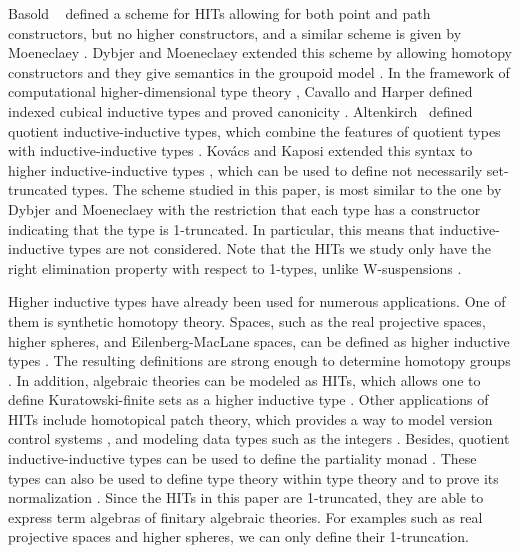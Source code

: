 Basold \etal \ \cite{BasoldGW17} defined a scheme for HITs allowing for both point and path constructors,
but no higher constructors, and a similar scheme is given by
Moeneclaey \cite{moeneclaey2016schema}. 
Dybjer and Moeneclaey extended this scheme by allowing homotopy constructors and
they give semantics in the groupoid model \cite{DBLP:journals/entcs/DybjerM18}.
In the framework of computational higher-dimensional type theory \cite{AngiuliHW17},
Cavallo and Harper defined indexed cubical inductive types and proved canonicity \cite{CavalloH19}.
Altenkirch \etal \ defined quotient inductive-inductive types, which combine the features
of quotient types with inductive-inductive types \cite{forsberg2010inductive,AltenkirchCDKF18}.
Kov\'acs and Kaposi extended this syntax to higher inductive-inductive types \cite{KaposiK18},
which can be used to define not necessarily set-truncated types.
The scheme studied in this paper, is most similar to the one by Dybjer and Moeneclaey \cite{DBLP:journals/entcs/DybjerM18}
with the restriction that each type has a constructor indicating that the type is 1-truncated.
In particular, this means that inductive-inductive types are not considered.
Note that the HITs we study only have the right elimination property with respect to 1-types,
unlike W-suspensions \cite{Sojakova15,sojakovaPhD}.

Higher inductive types have already been used for numerous applications.
One of them is synthetic homotopy theory.
Spaces, such as the real projective spaces, higher spheres, and Eilenberg-MacLane spaces,
can be defined as higher inductive types \cite{licata2013pi,LicataF14,DBLP:conf/lics/BuchholtzR17,hottbook}.
The resulting definitions are strong enough to determine homotopy groups
\cite{licata2013pi,LicataS13}.
In addition, algebraic theories can be modeled as HITs, which allows one
to define Kuratowski-finite sets as a higher inductive type \cite{frumin2018finite}.
Other applications of HITs include homotopical patch theory, which provides a way
to model version control systems \cite{AngiuliMLH16}, and modeling data types
such as the integers \cite{BasoldGW17,altenkirchscoccola}.
Besides, quotient inductive-inductive types can be used to define the partiality monad \cite{AltenkirchDK17}.
These types can also be used to define type theory within type theory \cite{AltenkirchK16}
and to prove its normalization \cite{DBLP:journals/lmcs/AltenkirchK17}.
Since the HITs in this paper are 1-truncated, they are able to express term algebras of finitary algebraic theories.
For examples such as real projective spaces and higher spheres, we can only define their 1-truncation.

